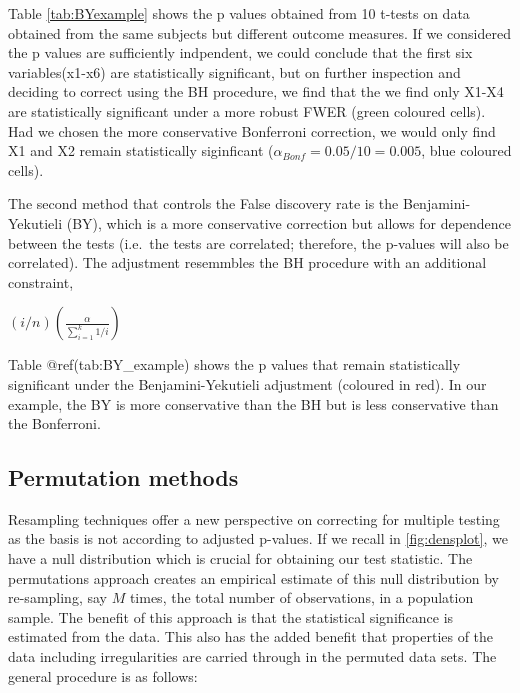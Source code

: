 \documentclass[]{book}
\begin{document}
Table \ref{tab:BYexample} shows the p values obtained from 10 t-tests on data obtained from the same subjects but different outcome measures. If we considered the p values are sufficiently indpendent, we could conclude that the first six variables(x1-x6) are statistically significant, but on further inspection and deciding to correct using the BH procedure, we find that the we find only X1-X4 are statistically significant under a more robust FWER (green coloured cells). Had we chosen the more conservative Bonferroni correction, we would only find X1 and X2 remain statistically siginficant (\(\alpha_{Bonf}=0.05/10=0.005\), blue coloured cells).

The second method that controls the False discovery rate is the Benjamini-Yekutieli (BY), which is a more conservative correction but allows for dependence between the tests (i.e.~the tests are correlated; therefore, the p-values will also be correlated). The adjustment resemmbles the BH procedure with an additional constraint,

\((i/n)(\frac{\alpha}{\sum_{i=1}^{k} 1/i})\)

Table @ref(tab:BY\_example) shows the p values that remain statistically significant under the Benjamini-Yekutieli adjustment (coloured in red). In our example, the BY is more conservative than the BH but is less conservative than the Bonferroni.

\hypertarget{permutation-methods}{%
\subsection{Permutation methods}\label{permutation-methods}}

Resampling techniques offer a new perspective on correcting for multiple testing as the basis is not according to adjusted p-values. If we recall in \ref{fig:densplot}, we have a null distribution which is crucial for obtaining our test statistic. The permutations approach creates an empirical estimate of this null distribution by re-sampling, say \(M\) times, the total number of observations, in a population sample. The benefit of this approach is that the statistical significance is estimated from the data. This also has the added benefit that properties of the data including irregularities are carried through in the permuted data sets. The general procedure is as follows:
\end{document}
